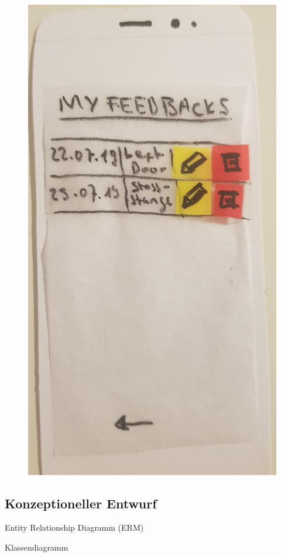 \begin{figure}[H]
\begin{minipage}{.5\textwidth}
		\includegraphics[width=.8\linewidth]{resources/conception/lowfi_list.jpg}
		\label{fig:pplist}
	\end{minipage}
\end{figure}

\subsection{Konzeptioneller Entwurf}




Entity Relationship Diagramm (ERM)


Klassendiagramm